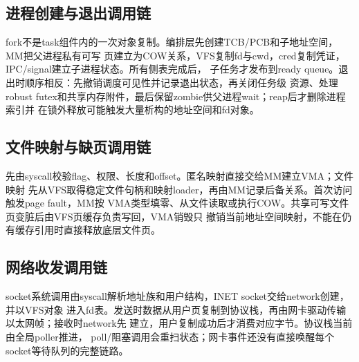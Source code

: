 \begin{center}
\end{center}

\subsection{进程创建与退出调用链}

fork不是task组件内的一次对象复制。编排层先创建TCB/PCB和子地址空间，MM把父进程私有可写
页建立为COW关系，VFS复制fd与cwd，cred复制凭证，IPC/signal建立子进程状态。所有侧表完成后，
子任务才发布到ready queue。退出时顺序相反：先撤销调度可见性并记录退出状态，再关闭任务级
资源、处理robust futex和共享内存附件，最后保留zombie供父进程wait；reap后才删除进程索引并
在锁外释放可能触发大量析构的地址空间和fd对象。

\subsection{文件映射与缺页调用链}

先由syscall校验flag、权限、长度和offset。匿名映射直接交给MM建立VMA；文件映射
先从VFS取得稳定文件句柄和映射loader，再由MM记录后备关系。首次访问触发page fault，MM按
VMA类型填零、从文件读取或执行COW。共享可写文件页变脏后由VFS页缓存负责写回，VMA销毁只
撤销当前地址空间映射，不能在仍有缓存引用时直接释放底层文件页。

\subsection{网络收发调用链}

socket系统调用由syscall解析地址族和用户结构，INET socket交给network创建，并以VFS对象
进入fd表。发送时数据从用户页复制到协议栈，再由网卡驱动传输以太网帧；接收时network先
建立，用户复制成功后才消费对应字节。协议栈当前由全局poller推进，
poll/阻塞调用会重扫状态；网卡事件还没有直接唤醒每个socket等待队列的完整链路。

